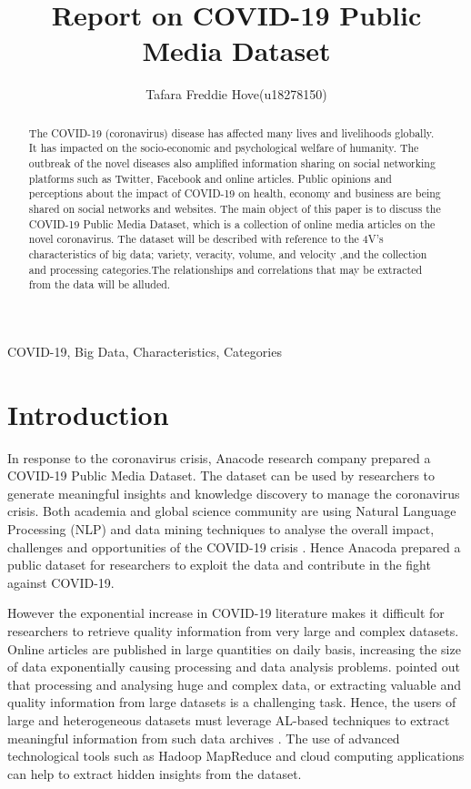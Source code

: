 \documentclass[11pt,twoside,conference]{IEEEtran}
\title{Report on COVID-19 Public Media Dataset}
\author{Tafara Freddie Hove(u18278150)}
\begin{document}
\maketitle

\begin{abstract}
  The COVID-19 (coronavirus) disease has affected many lives and livelihoods globally. It has impacted on the socio-economic and psychological welfare of humanity.  The outbreak of the novel diseases also amplified information sharing on social networking platforms such as Twitter, Facebook and online articles. Public opinions and perceptions about the impact of COVID-19 on health, economy and  business are being shared on social networks and websites. The main object of this paper is to discuss the COVID-19 Public Media Dataset, which is a collection of online media articles on the novel coronavirus. The dataset will be described with reference to the 4V's characteristics of big data; variety, veracity, volume, and velocity ,and the collection and processing categories.The relationships and correlations that may be extracted from the data will be alluded.
\end{abstract}

\begin{IEEEkeywords}
    COVID-19, Big Data, Characteristics, Categories
\end{IEEEkeywords}

\section{Introduction}
In response to the coronavirus crisis, Anacode research company prepared a COVID-19 Public Media Dataset.  The dataset can be used by researchers to generate meaningful insights and knowledge discovery to manage the coronavirus crisis. Both academia and global science community are using Natural Language Processing (NLP) and data mining techniques to analyse the overall impact, challenges and opportunities of the COVID-19 crisis \cite{Wang et al}. Hence Anacoda prepared a public  dataset for researchers to exploit the data and contribute in the fight against COVID-19. 

However the exponential increase in COVID-19 literature makes it difficult for researchers to retrieve quality information from very large and complex datasets. Online articles are published in large quantities on daily basis, increasing the size of data exponentially causing processing and data analysis problems. \cite{Patel et al} pointed out that processing and analysing huge and complex data, or extracting valuable and quality information from large datasets is a challenging task. Hence, the users of large and heterogeneous datasets must leverage AL-based techniques to extract meaningful information from such data archives \cite{Wang et al}. The use of advanced technological tools such as Hadoop MapReduce  and cloud computing applications can help to extract hidden insights from the dataset. 
 
\end{document}
